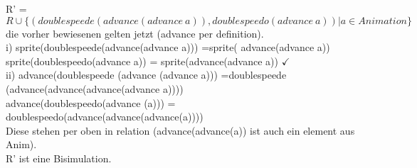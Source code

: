\documentclass{article}
\theoremstyle{definition}
\begin{document}
	R' = $R\cup \{(doublespeede(advance(advance\ a)), doublespeedo(advance\ a))|a\in Animation\}$\\
	die vorher bewiesenen gelten jetzt (advance per definition).\\
	i) sprite(doublespeede(advance(advance a))) =sprite( advance(advance a))\\
	sprite(doublespeedo(advance a)) = sprite(advance(advance a)) $\checkmark$\\
	ii) advance(doublespeede (advance (advance a))) =doublespeede (advance(advance(advance(advance a))))\\
	advance(doublespeedo(advance (a))) = doublespeedo(advance(advance(advance(a))))\\
	Diese stehen per oben in relation (advance(advance(a)) ist auch ein element aus Anim).\\
	R' ist eine Bisimulation.\\
	
\end{document}
